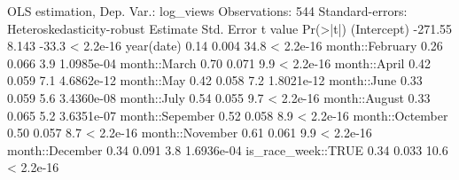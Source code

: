 \documentclass[12pt]{article}
\begin{document}
  \begin{smallcodeblock}[{}]
OLS estimation, Dep. Var.: log_views
Observations: 544
Standard-errors: Heteroskedasticity-robust
                  Estimate Std. Error t value   Pr(>|t|)
(Intercept)        -271.55      8.143   -33.3  < 2.2e-16 
year(date)            0.14      0.004    34.8  < 2.2e-16 
month::February       0.26      0.066     3.9 1.0985e-04 
month::March          0.70      0.071     9.9  < 2.2e-16 
month::April          0.42      0.059     7.1 4.6862e-12 
month::May            0.42      0.058     7.2 1.8021e-12 
month::June           0.33      0.059     5.6 3.4360e-08 
month::July           0.54      0.055     9.7  < 2.2e-16 
month::August         0.33      0.065     5.2 3.6351e-07 
month::Sepember       0.52      0.058     8.9  < 2.2e-16 
month::Octember       0.50      0.057     8.7  < 2.2e-16 
month::November       0.61      0.061     9.9  < 2.2e-16 
month::December       0.34      0.091     3.8 1.6936e-04 
is_race_week::TRUE    0.34      0.033    10.6  < 2.2e-16 
  \end{smallcodeblock}
\end{document}
